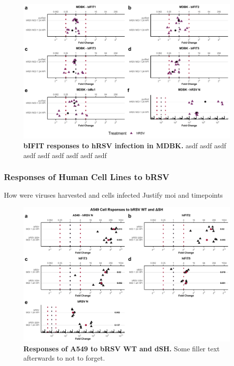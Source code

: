 \begin{figure}
    \centering
    \includegraphics[width=1\linewidth]{07. Chapter 2//Figs/07. mdbk_hrsv_plots.pdf}
    \caption[bIFIT responses to hRSV infection in MDBK.]{\textbf{bIFIT responses to hRSV infection in MDBK.} asdf asdf asdf asdf asdf asdf asdf asdf asdf }
    \label{bIFIT responses to hRSV infection in MDBK}
\end{figure}




\subsubsection{Responses of Human Cell Lines to bRSV} \label{Responses of Human Cell Lines to bRSV}
How were viruses harvested and cells infected \newline
Justify moi and timepoints

\begin{figure}
    \centering
    \includegraphics[width=1\linewidth]{06. Chapter 1/Figs/01. Induction/07. a549_brsv_moi1.pdf}
    \caption[Responses of A549 to bRSV WT and dSH.]{\textbf{Responses of A549 to bRSV WT and dSH.} Some filler text afterwards to not to forget.}
    \label{Responses of A549 to bRSV WT and dSH.}
\end{figure}

